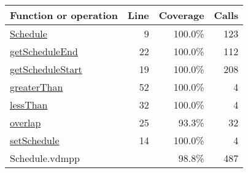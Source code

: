 \bigskip
\begin{longtable}{|l|r|r|r|}
\hline
Function or operation & Line & Coverage & Calls \\
\hline
\hline
\hyperref[Schedule:9]{Schedule} & 9&100.0\% & 123 \\
\hline
\hyperref[getScheduleEnd:22]{getScheduleEnd} & 22&100.0\% & 112 \\
\hline
\hyperref[getScheduleStart:19]{getScheduleStart} & 19&100.0\% & 208 \\
\hline
\hyperref[greaterThan:52]{greaterThan} & 52&100.0\% & 4 \\
\hline
\hyperref[lessThan:32]{lessThan} & 32&100.0\% & 4 \\
\hline
\hyperref[overlap:25]{overlap} & 25&93.3\% & 32 \\
\hline
\hyperref[setSchedule:14]{setSchedule} & 14&100.0\% & 4 \\
\hline
\hline
Schedule.vdmpp & & 98.8\% & 487 \\
\hline
\end{longtable}

